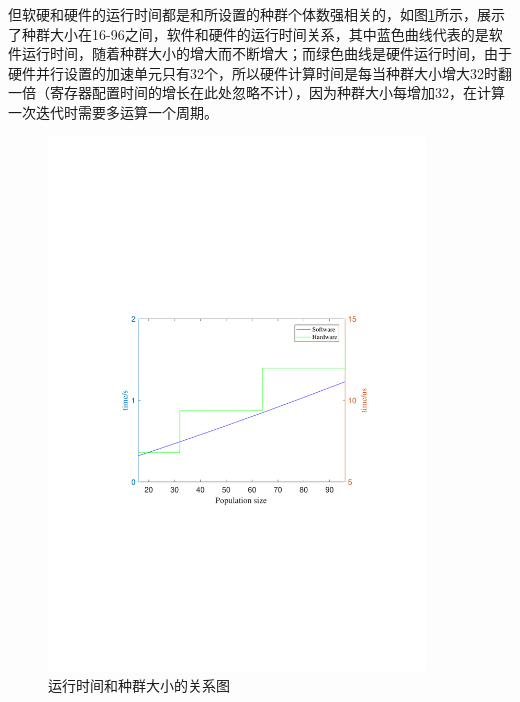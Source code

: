 但软硬和硬件的运行时间都是和所设置的种群个体数强相关的，如图\ref{fig:运行时间和种群大小的关系图}所示，展示了种群大小在16-96之间，软件和硬件的运行时间关系，其中蓝色曲线代表的是软件运行时间，随着种群大小的增大而不断增大；而绿色曲线是硬件运行时间，由于硬件并行设置的加速单元只有32个，所以硬件计算时间是每当种群大小增大32时翻一倍（寄存器配置时间的增长在此处忽略不计），因为种群大小每增加32，在计算一次迭代时需要多运算一个周期。
\begin{figure}[htb]
  \centering
  \includegraphics[width=10cm]{fig/6-fig/运行时间和种群大小的关系.pdf}
  \caption{运行时间和种群大小的关系图}
  \label{fig:运行时间和种群大小的关系图}
\end{figure}

